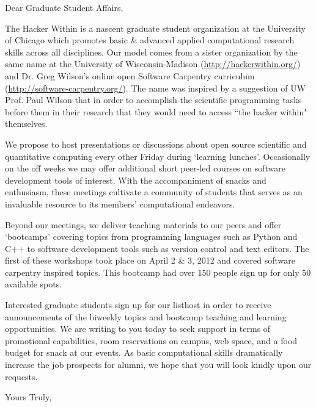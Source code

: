 \documentclass{letter}
\begin{document}
\begin{letter}{}
\opening{Dear Graduate Student Affairs,}
The Hacker Within is a nascent graduate student organization at the University of 
Chicago which promotes basic \& advanced applied computational research skills across all 
disciplines.  Our model comes from a sister organization by the same name at 
the University of Wisconsin-Madison (\url{http://hackerwithin.org/}) and Dr. Greg
Wilson's online open Software Carpentry curriculum (\url{http://software-carpentry.org/}). 
The name was inspired by a suggestion of UW Prof. Paul Wilson that in order to 
accomplish the scientific programming tasks before them in their research that 
they would need to access ``the hacker within" themselves.

We propose to host presentations or discussions about open source scientific and quantitative 
computing every other Friday during `learning lunches'.  Occasionally on the off weeks 
we may offer additional short peer-led courses on software development tools of interest. 
With the accompaniment of snacks and enthusiasm, these meetings cultivate a community of 
students that serves as an invaluable resource to its members' computational endeavors.

Beyond our meetings, we deliver teaching materials to our peers and offer `bootcamps' 
covering topics from programming languages such as Python and C++ to software development 
tools such as version control and text editors. The first of these workshops took place 
on April 2 \& 3, 2012 and covered software carpentry inspired topics.  This bootcamp had
over 150 people sign up for only 50 available spots.

Interested graduate students sign up for our listhost in order to receive announcements 
of the biweekly topics and bootcamp teaching and learning opportunities.  We are writing 
to you today to seek support in terms of promotional capabilities, room reservations on 
campus, web space, and a food budget for snack at our events.  As basic computational 
skills dramatically increase the job prospects for alumni, we hope that you will look
kindly upon our requests.

\closing{Yours Truly,}

\end{letter}
\end{document}
